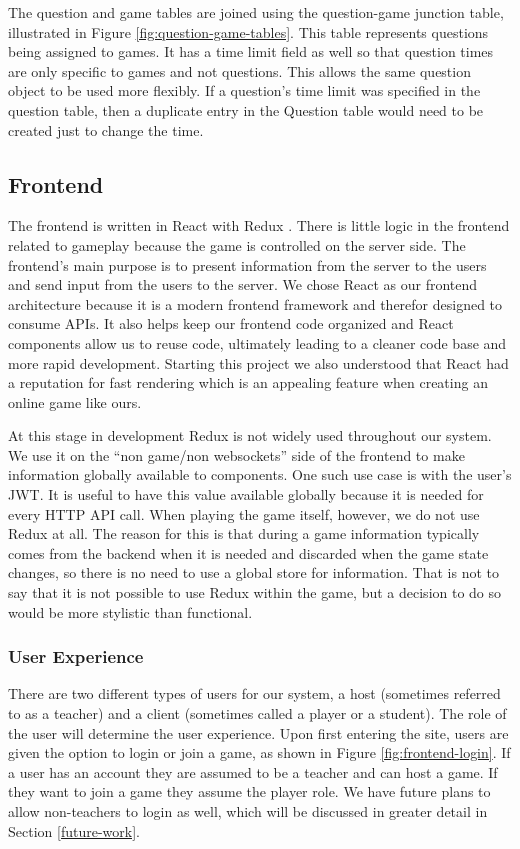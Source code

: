 \documentclass{article}
\begin{document}
    		The question and game tables are joined using the question-game junction table, illustrated in Figure \ref{fig:question-game-tables}. This table represents questions being assigned to games. It has a time limit field as well so that question times are only specific to games and not questions. This allows the same question object to be used more flexibly. If a question's time limit was specified in the question table, then a duplicate entry in the Question table would need to be created just to change the time.

	\subsection{Frontend}
	    The frontend is written in React with Redux \cite{redux}. There is little logic in the frontend related to gameplay because the game is controlled on the server side. The frontend's main purpose is to present information from the server to the users and send input from the users to the server. We chose React as our frontend architecture because it is a modern frontend framework and therefor designed to consume APIs. It also helps keep our frontend code organized and React components allow us to reuse code, ultimately leading to a cleaner code base and more rapid development. Starting this project we also understood that React had a reputation for fast rendering which is an appealing feature when creating an online game like ours.
	    \smallskip
	    
	    At this stage in development Redux is not widely used throughout our system. We use it on the ``non game/non websockets'' side of the frontend to make information globally available to components. One such use case is with the user's JWT. It is useful to have this value available globally because it is needed for every HTTP API call. When playing the game itself, however, we do not use Redux at all. The reason for this is that during a game information typically comes from the backend when it is needed and discarded when the game state changes, so there is no need to use a global store for information. That is not to say that it is not possible to use Redux within the game, but a decision to do so would be more stylistic than functional.
	    
	    \subsubsection{User Experience} \label{ux}
	        There are two different types of users for our system, a host (sometimes referred to as a teacher) and a client (sometimes called a player or a student). The role of the user will determine the user experience. Upon first entering the site, users are given the option to login or join a game, as shown in Figure \ref{fig:frontend-login}. If a user has an account they are assumed to be a teacher and can host a game. If they want to join a game they assume the player role. We have future plans to allow non-teachers to login as well, which will be discussed in greater detail in Section \ref{future-work}.
	        
\end{document}
